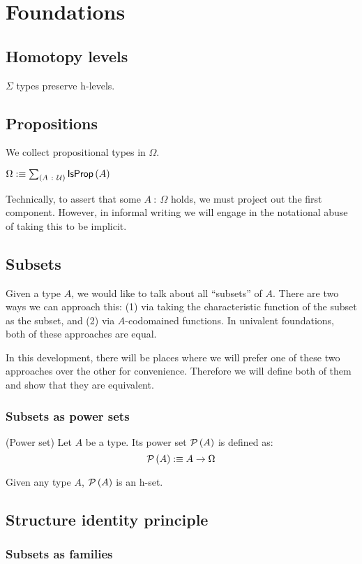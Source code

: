\chapter{Foundations}

\section{Homotopy levels}

\begin{prop}\label{isOfHLevelSigma}
  $\Sigma$ types preserve h-levels.
\end{prop}

\section{Propositions}

We collect propositional types in $\Omega$.

\begin{defn}\label{omega}
  $\Omega :\equiv \sum_{(A~:~\mathcal{U})} \mathsf{IsProp}\left(A\right)$
\end{defn}

Technically, to assert that some $A~:~\Omega$ holds, we must project out the first component.
However, in informal writing we will engage in the notational abuse of taking this to be
implicit.

\section{Subsets}

Given a type $A$, we would like to talk about all ``subsets'' of $A$. There are
two ways we can approach this: (1) via taking the characteristic function of the
subset as the subset, and (2) via $A$-codomained functions. In univalent
foundations, both of these approaches are equal.

In this development, there will be places where we will prefer one of these two
approaches over the other for convenience. Therefore we will define both of them
and show that they are equivalent.

\subsection{Subsets as power sets}

\begin{defn}(Power set)
  Let $A$ be a type. Its power set $\mathcal{P}\left(A\right)$ is defined as:
  \begin{equation*}
    \mathcal{P}\left(A\right) :\equiv A \rightarrow \Omega
  \end{equation*}
\end{defn}

\begin{prop}\label{isSetPow}
  Given any type $A$, $\mathcal{P}\left(A\right)$ is an h-set.
\end{prop}

\section{Structure identity principle}

\subsection{Subsets as families}
